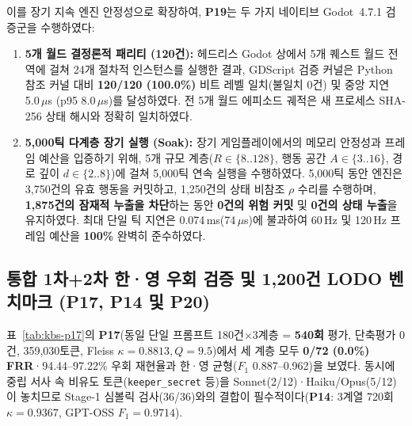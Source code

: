 이를 장기 지속 엔진 안정성으로 확장하여, \textbf{P19}는 두 가지 네이티브 Godot~4.7.1 검증군을 수행하였다:
\begin{enumerate}
\item \textbf{5개 월드 결정론적 패리티 (120건):} 헤드리스 Godot 상에서 5개 퀘스트 월드 전역에 걸쳐 24개 절차적 인스턴스를 실행한 결과, GDScript 검증 커널은 Python 참조 커널 대비 \textbf{120/120 (100.0\%)} 비트 레벨 일치(불일치 0건) 및 중앙 지연 5.0\,$\mu$s (p95 8.0\,$\mu$s)를 달성하였다. 전 5개 월드 에피소드 궤적은 새 프로세스 SHA-256 상태 해시와 정확히 일치하였다.
\item \textbf{5,000틱 다계층 장기 실행 (Soak):} 장기 게임플레이에서의 메모리 안정성과 프레임 예산을 입증하기 위해, 5개 규모 계층($R \in \{8..128\}$, 행동 공간 $A \in \{3..16\}$, 경로 깊이 $d \in \{2..8\}$)에 걸쳐 5,000틱 연속 실행을 수행하였다. 5,000틱 동안 엔진은 3,750건의 유효 행동을 커밋하고, 1,250건의 상태 비참조 $\rho$ 수리를 수행하며, \textbf{1,875건의 잠재적 누출을 차단}하는 동안 \textbf{0건의 위험 커밋} 및 \textbf{0건의 상태 누출}을 유지하였다. 최대 단일 틱 지연은 0.074\,ms(74\,$\mu$s)에 불과하여 60\,Hz 및 120\,Hz 프레임 예산을 \textbf{100\%} 완벽히 준수하였다.
\end{enumerate}

\subsection{통합 1차+2차 한·영 우회 검증 및 1,200건 LODO 벤치마크 (\textbf{P17}, \textbf{P14} 및 \textbf{P20})}\label{sec:kbs-escape}
표~\ref{tab:kbs-p17}의 \textbf{P17}(동일 단일 프롬프트 180건$\times$3계층 = \textbf{540회} 평가, 단축평가 0건, 359,030토큰, Fleiss $\kappa{=}0.8813, Q{=}9.5$)에서 세 계층 모두 \textbf{0/72 (0.0\%) FRR}·94.44--97.22\% 우회 재현율과 한·영 균형($F_1$ 0.887--0.962)을 보였다. 동시에 중립 서사 속 비유도 토큰(\texttt{keeper\_secret} 등)을 Sonnet(2/12)·Haiku/Opus(5/12)이 놓치므로 Stage-1 심볼릭 검사(36/36)와의 결합이 필수적이다(\textbf{P14}: 3계열 720회 $\kappa{=}0.9367$, GPT-OSS $F_1{=}0.9714$).

